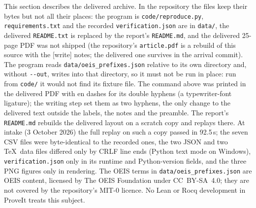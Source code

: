 \begin{writenote}
This section describes the delivered archive. In the repository the files
keep their bytes but not all their places: the program is
\texttt{code/\allowbreak reproduce.py}, \texttt{requirements.txt} and the
recorded \texttt{verification.json} are in \texttt{data/}, the delivered
\texttt{README.txt} is replaced by the report's \texttt{README.md}, and the
delivered 25-page PDF was not shipped (the repository's
\texttt{article.pdf} is a rebuild of this source with the \textsf{[write]}
notes; the delivered one survives in the arrival commit). The program reads
\texttt{data/\allowbreak oeis\_prefixes.json} relative to its own directory
and, without \texttt{-{}-out}, writes into that directory, so it must not be
run in place: run from \texttt{code/} it would not find its fixture file. The
command above was printed in the delivered PDF with en dashes for its double
hyphens (a typewriter-font ligature); the writing step set them as two
hyphens, the only change to the delivered text outside the labels, the
notes and the preamble. The
report's \texttt{README.md} rebuilds the delivered layout on a scratch copy
and replays there. At intake (3 October 2026) the full replay on such a copy
passed in 92.5\,s; the seven CSV files were byte-identical to the recorded
ones, the two JSON and two \TeX\ data files differed only by CRLF line ends
(Python text mode on Windows), \texttt{verification.json} only in its
runtime and Python-version fields, and the three PNG figures only in
rendering. The OEIS terms in \texttt{data/\allowbreak oeis\_prefixes.json}
are OEIS content, licensed by The OEIS Foundation under CC~BY-SA~4.0; they
are not covered by the repository's MIT-0 licence. No Lean or Rocq
development in ProveIt treats this subject.
\end{writenote}

